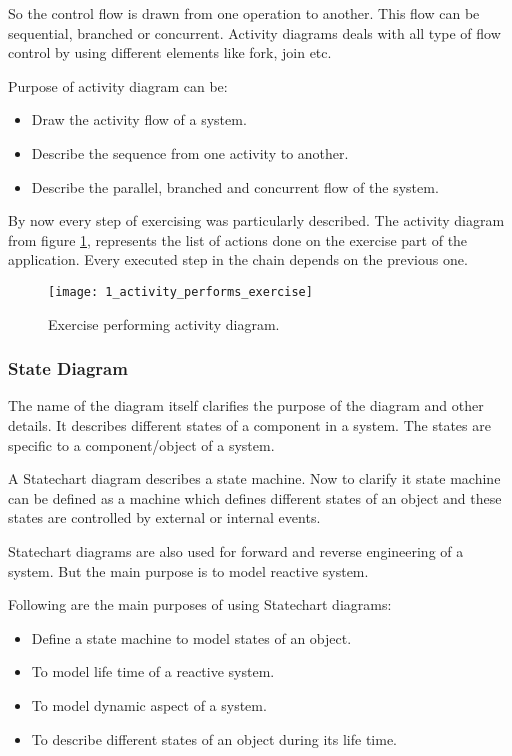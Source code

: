 So the control flow is drawn from one operation to another. This flow can be sequential, branched or concurrent. Activity diagrams deals with all type of flow control by using different elements like fork, join etc.


Purpose of activity diagram can be:
\begin{itemize}
\item Draw the activity flow of a system.
\item Describe the sequence from one activity to another.
\item Describe the parallel, branched and concurrent flow of the system.
\end{itemize}
\vspace{0.2cm}

By now every step of exercising was particularly described.
The activity diagram from  \mbox{figure} \ref{activity_performs}, represents the list of actions done on the exercise part of the application. Every executed step in the chain  depends on the previous one.

\begin{figure}[!h]
\centering
\texttt{[image: 1\_activity\_performs\_exercise]}
\caption{Exercise performing activity diagram.}\label{activity_performs}
\end{figure}

\clearpage

\subsubsection{State Diagram}
The name of the diagram itself clarifies the purpose of the diagram and other details. It describes different states of a component in a system. The states are specific to a component/object of a system.

A Statechart diagram describes a state machine. Now to clarify it state machine can be defined as a machine which defines different states of an object and these states are controlled by external or internal events.

Statechart diagrams are also used for forward and reverse engineering of a system. But the main purpose is to model reactive system.


Following are the main purposes of using Statechart diagrams:

\begin{itemize}
\item Define a state machine to model states of an object.
\item To model life time of a reactive system.
\item To model dynamic aspect of a system.
\item To describe different states of an object during its life time.
\end{itemize}


